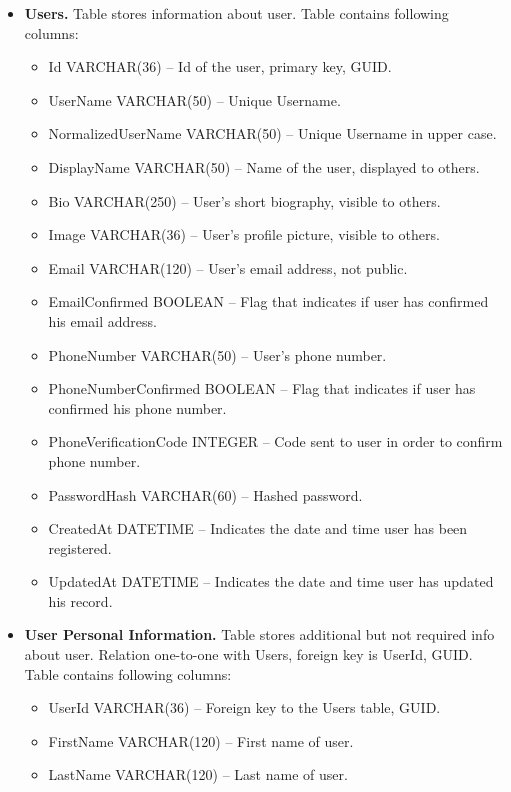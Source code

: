 \begin{itemize}
    \item \textbf{Users.} Table stores information about user.
    Table contains following columns:
    \begin{itemize}
        \item Id VARCHAR(36) -- Id of the user, primary key, GUID\@.
        \item UserName VARCHAR(50) -- Unique Username.
        \item NormalizedUserName VARCHAR(50) -- Unique Username in upper case.
        \item DisplayName VARCHAR(50) -- Name of the user, displayed to others.
        \item Bio VARCHAR(250) -- User's short biography, visible to others.
        \item Image VARCHAR(36) -- User's profile picture, visible to others.
        \item Email VARCHAR(120) -- User's email address, not public.
        \item EmailConfirmed BOOLEAN -- Flag that indicates if user has confirmed his email address.
        \item PhoneNumber VARCHAR(50) -- User's phone number.
        \item PhoneNumberConfirmed BOOLEAN -- Flag that indicates if user has confirmed his phone number.
        \item PhoneVerificationCode INTEGER -- Code sent to user in order to confirm phone number.
        \item PasswordHash VARCHAR(60) -- Hashed password.
        \item CreatedAt DATETIME -- Indicates the date and time user has been registered.
        \item UpdatedAt DATETIME -- Indicates the date and time user has updated his record.
    \end{itemize}
    \item \textbf{User Personal Information.} Table stores additional but not required info about user.
    Relation one-to-one with Users, foreign key is UserId, GUID\@.
    Table contains following columns:
    \begin{itemize}
        \item UserId VARCHAR(36) -- Foreign key to the Users table, GUID\@.
        \item FirstName VARCHAR(120) -- First name of user.
        \item LastName VARCHAR(120) -- Last name of user.

\end{itemize}
\end{itemize}
